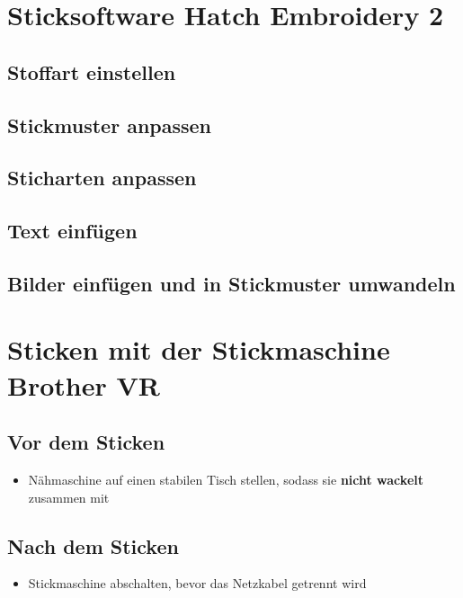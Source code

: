 \documentclass{\basedir/fablab-document}
\begin{document}
\section{Sticksoftware Hatch Embroidery 2}

\subsection{Stoffart einstellen}

\subsection{Stickmuster anpassen}

\subsection{Sticharten anpassen}

\subsection{Text einfügen}

\subsection{Bilder einfügen und in Stickmuster umwandeln}

\pagebreak

\section{Sticken mit der Stickmaschine Brother VR}

\subsection{Vor dem Sticken}
\begin{itemize}
	\item Nähmaschine auf einen stabilen Tisch stellen, sodass sie \textbf{nicht wackelt} zusammen mit
\end{itemize}

\subsection{Nach dem Sticken}
\begin{itemize}
	\item Stickmaschine abschalten, bevor das Netzkabel getrennt wird
\end{itemize}
\end{document}
